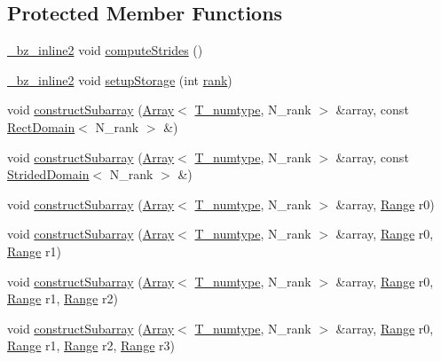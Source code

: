 \subsection*{Protected Member Functions}
\begin{DoxyCompactItemize}
\item 
\hyperlink{tuning_8h_a6848dd8288da8ca7c75f65e75d3ec302}{\+\_\+bz\+\_\+inline2} void \hyperlink{classArray_abc8b772aea64da89e92f029d64403ac5}{compute\+Strides} ()
\item 
\hyperlink{tuning_8h_a6848dd8288da8ca7c75f65e75d3ec302}{\+\_\+bz\+\_\+inline2} void \hyperlink{classArray_a22b37cc98defdc9d72f390931512697c}{setup\+Storage} (int \hyperlink{classArray_a1563c492c1be9d9b95a3f53d9cd89fae}{rank})
\item 
void \hyperlink{classArray_ab73a1e3fdddbb0c207cddf7f575f26dd}{construct\+Subarray} (\hyperlink{classArray}{Array}$<$ \hyperlink{classArray_ae72770f4a1d2f8b7193badafc320f008}{T\+\_\+numtype}, N\+\_\+rank $>$ \&array, const \hyperlink{classRectDomain}{Rect\+Domain}$<$ N\+\_\+rank $>$ \&)
\item 
void \hyperlink{classArray_af9cf267d3c93ac2dcd87029853cc9db8}{construct\+Subarray} (\hyperlink{classArray}{Array}$<$ \hyperlink{classArray_ae72770f4a1d2f8b7193badafc320f008}{T\+\_\+numtype}, N\+\_\+rank $>$ \&array, const \hyperlink{classStridedDomain}{Strided\+Domain}$<$ N\+\_\+rank $>$ \&)
\item 
void \hyperlink{classArray_ae89f82742aaaa0a97edfc66a34e57b32}{construct\+Subarray} (\hyperlink{classArray}{Array}$<$ \hyperlink{classArray_ae72770f4a1d2f8b7193badafc320f008}{T\+\_\+numtype}, N\+\_\+rank $>$ \&array, \hyperlink{classRange}{Range} r0)
\item 
void \hyperlink{classArray_a7baac1b30a7c8053d81782bef87199b3}{construct\+Subarray} (\hyperlink{classArray}{Array}$<$ \hyperlink{classArray_ae72770f4a1d2f8b7193badafc320f008}{T\+\_\+numtype}, N\+\_\+rank $>$ \&array, \hyperlink{classRange}{Range} r0, \hyperlink{classRange}{Range} r1)
\item 
void \hyperlink{classArray_a45ea008468c47ffd002623231aba8674}{construct\+Subarray} (\hyperlink{classArray}{Array}$<$ \hyperlink{classArray_ae72770f4a1d2f8b7193badafc320f008}{T\+\_\+numtype}, N\+\_\+rank $>$ \&array, \hyperlink{classRange}{Range} r0, \hyperlink{classRange}{Range} r1, \hyperlink{classRange}{Range} r2)
\item 
void \hyperlink{classArray_aecf4323d2b0d3bd71daacf5304e3790f}{construct\+Subarray} (\hyperlink{classArray}{Array}$<$ \hyperlink{classArray_ae72770f4a1d2f8b7193badafc320f008}{T\+\_\+numtype}, N\+\_\+rank $>$ \&array, \hyperlink{classRange}{Range} r0, \hyperlink{classRange}{Range} r1, \hyperlink{classRange}{Range} r2, \hyperlink{classRange}{Range} r3)

\end{DoxyCompactItemize}
